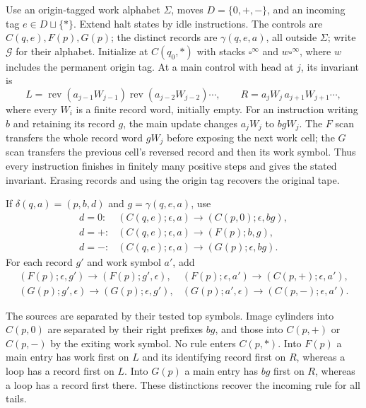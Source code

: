 Use an origin-tagged work alphabet $\Sigma$, moves $D=\{0,+,-\}$, and
an incoming tag $e\in D\sqcup\{*\}$.  Extend halt states by idle
instructions.  The controls are $C(q,e),F(p),G(p)$; the distinct records
are $\gamma(q,e,a)$, all outside $\Sigma$; write $\mathcal G$ for
their alphabet.  Initialize at $C(q_0,*)$ with stacks $\square^\infty$ and
$w\square^\infty$, where $w$ includes the permanent origin tag.
At a main control with head at $j$, its invariant is
\[
 L=\operatorname{rev}(a_{j-1}W_{j-1})
   \operatorname{rev}(a_{j-2}W_{j-2})\cdots,
 \qquad R=a_jW_j\,a_{j+1}W_{j+1}\cdots,
\]
where every $W_i$ is a finite record word, initially empty.  For an instruction writing $b$ and retaining its record $g$, the main
update changes $a_jW_j$ to $bgW_j$.  The $F$ scan transfers the whole record word $gW_j$
before exposing the next work cell; the $G$ scan transfers the previous
cell's reversed record and then its work symbol.  Thus every instruction
finishes in finitely many positive steps and gives the stated invariant.
Erasing records and using the origin tag recovers the original tape.

If $\delta(q,a)=(p,b,d)$ and $g=\gamma(q,e,a)$,
use
\begin{equation}\label{eq:sa-cell-records-3}
\begin{array}{ll}
 d=0:&(C(q,e);\epsilon,a)\to(C(p,0);\epsilon,bg),\\
 d=+:&(C(q,e);\epsilon,a)\to(F(p);b,g),\\
 d=-:&(C(q,e);\epsilon,a)\to(G(p);\epsilon,bg).
\end{array}
\end{equation}
For each record $g'$ and work symbol $a'$, add
\begin{equation}\label{eq:sa-cell-records-4}
\begin{array}{ll}
 (F(p);\epsilon,g')\to(F(p);g',\epsilon),&
 (F(p);\epsilon,a')\to(C(p,+);\epsilon,a'),\\
 (G(p);g',\epsilon)\to(G(p);\epsilon,g'),&
 (G(p);a',\epsilon)\to(C(p,-);\epsilon,a').
\end{array}
\end{equation}


The sources are separated by their tested top symbols.  Image cylinders
into $C(p,0)$ are separated by their right prefixes $bg$, and those into
$C(p,+)$ or $C(p,-)$ by the exiting work symbol.  No rule enters $C(p,*)$.
Into $F(p)$ a main entry has work first on $L$ and its identifying record
first on $R$, whereas a loop has a record first on $L$.  Into $G(p)$ a
main entry has $bg$ first on $R$, whereas a loop has a record first there.
These distinctions recover the incoming rule for all tails.

